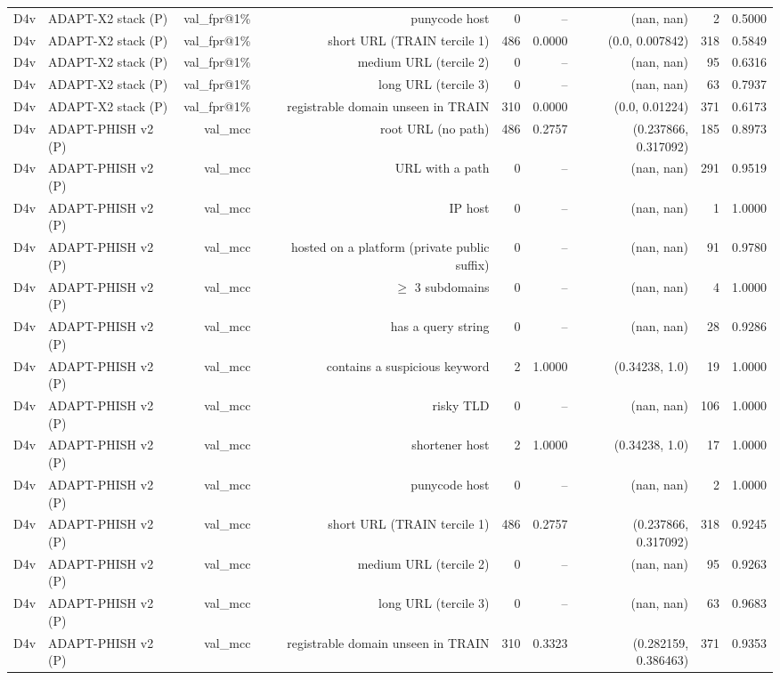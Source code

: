 \begin{table}[t]
\begin{tabular}{llrrrrrrr}
D4v & ADAPT-X2 stack (P) & val\_fpr@1\% & punycode host & 0 & -- & (nan, nan) & 2 & 0.5000 \\
D4v & ADAPT-X2 stack (P) & val\_fpr@1\% & short URL (TRAIN tercile 1) & 486 & 0.0000 & (0.0, 0.007842) & 318 & 0.5849 \\
D4v & ADAPT-X2 stack (P) & val\_fpr@1\% & medium URL (tercile 2) & 0 & -- & (nan, nan) & 95 & 0.6316 \\
D4v & ADAPT-X2 stack (P) & val\_fpr@1\% & long URL (tercile 3) & 0 & -- & (nan, nan) & 63 & 0.7937 \\
D4v & ADAPT-X2 stack (P) & val\_fpr@1\% & registrable domain unseen in TRAIN & 310 & 0.0000 & (0.0, 0.01224) & 371 & 0.6173 \\
D4v & ADAPT-PHISH v2 (P) & val\_mcc & root URL (no path) & 486 & 0.2757 & (0.237866, 0.317092) & 185 & 0.8973 \\
D4v & ADAPT-PHISH v2 (P) & val\_mcc & URL with a path & 0 & -- & (nan, nan) & 291 & 0.9519 \\
D4v & ADAPT-PHISH v2 (P) & val\_mcc & IP host & 0 & -- & (nan, nan) & 1 & 1.0000 \\
D4v & ADAPT-PHISH v2 (P) & val\_mcc & hosted on a platform (private public suffix) & 0 & -- & (nan, nan) & 91 & 0.9780 \\
D4v & ADAPT-PHISH v2 (P) & val\_mcc & $\geq$ 3 subdomains & 0 & -- & (nan, nan) & 4 & 1.0000 \\
D4v & ADAPT-PHISH v2 (P) & val\_mcc & has a query string & 0 & -- & (nan, nan) & 28 & 0.9286 \\
D4v & ADAPT-PHISH v2 (P) & val\_mcc & contains a suspicious keyword & 2 & 1.0000 & (0.34238, 1.0) & 19 & 1.0000 \\
D4v & ADAPT-PHISH v2 (P) & val\_mcc & risky TLD & 0 & -- & (nan, nan) & 106 & 1.0000 \\
D4v & ADAPT-PHISH v2 (P) & val\_mcc & shortener host & 2 & 1.0000 & (0.34238, 1.0) & 17 & 1.0000 \\
D4v & ADAPT-PHISH v2 (P) & val\_mcc & punycode host & 0 & -- & (nan, nan) & 2 & 1.0000 \\
D4v & ADAPT-PHISH v2 (P) & val\_mcc & short URL (TRAIN tercile 1) & 486 & 0.2757 & (0.237866, 0.317092) & 318 & 0.9245 \\
D4v & ADAPT-PHISH v2 (P) & val\_mcc & medium URL (tercile 2) & 0 & -- & (nan, nan) & 95 & 0.9263 \\
D4v & ADAPT-PHISH v2 (P) & val\_mcc & long URL (tercile 3) & 0 & -- & (nan, nan) & 63 & 0.9683 \\
D4v & ADAPT-PHISH v2 (P) & val\_mcc & registrable domain unseen in TRAIN & 310 & 0.3323 & (0.282159, 0.386463) & 371 & 0.9353 \\

\end{tabular}
\end{table}
